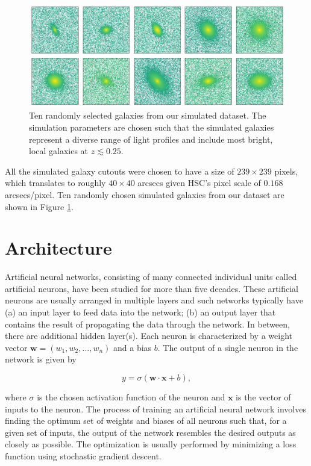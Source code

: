 \begin{figure}[htb]
    \centering
    \includegraphics[width
    =\textwidth]{random_sim_galaxies.png}
    \caption{Ten randomly selected galaxies from our simulated dataset. The simulation parameters are chosen such that the simulated galaxies represent a diverse range of light profiles and include most bright, local galaxies at $z \lesssim 0.25$.}
    \label{fig_c2:random_sim_galaxies}
\end{figure}

All the simulated galaxy cutouts were chosen to have a size of $239 \times 239$ pixels, which translates to roughly $40 \times 40$ arcsecs given HSC's pixel scale of $0.168$ arcsecs/pixel. Ten randomly chosen simulated galaxies from our dataset are shown in Figure \ref{fig_c2:random_sim_galaxies}. 


\section{\gampen{} Architecture} \label{sec_c2:cnn_description}

Artificial neural networks, consisting of many connected individual units called artificial neurons, have been studied for more than five decades. These artificial neurons are usually arranged in multiple layers and such networks typically have (a) an input layer to feed data into the network; (b) an output layer that contains the result of propagating the data through the network. In between, there are additional hidden layer(s). Each neuron is characterized by a weight vector $\bm{w}=(w_1,w_2,\ldots,w_n)$ and a bias $b$. The output of a single neuron in the network is given by 

\begin{equation}
y = \sigma(\bm{w} \cdot \bm{x} + b) ,
\label{eq_c2:neuron_output}
\end{equation}

\noindent
where $\sigma$ is the chosen activation function of the neuron and $\bm{x}$ is the vector of inputs to the neuron. 
The process of training an artificial neural network involves finding the optimum set of weights and biases of all neurons such that, for a given set of inputs, the output of the network resembles the desired outputs as closely as possible. The optimization is usually performed by minimizing a loss function using stochastic gradient descent.

